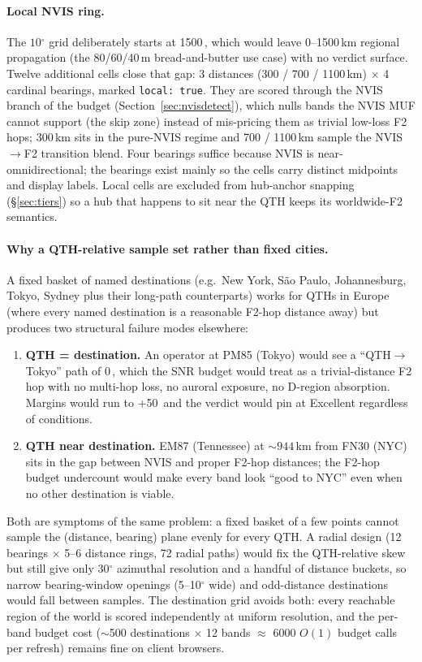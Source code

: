 \documentclass[11pt,a4paper]{article}
\newcommand{\SI}[2]{#1\,\text{#2}}
\newcommand{\dB}{\text{dB}}
\newcommand{\km}{\text{km}}
\newcommand{\degree}{\ensuremath{{}^\circ}}
\begin{document}
\paragraph{Local NVIS ring.}  The $10\degree$ grid deliberately
starts at \SI{1500}{\km}, which would leave 0--1500\,km regional
propagation (the 80/60/40\,m bread-and-butter use case)
with no verdict surface.  Twelve additional cells close that gap:
3 distances (300 / 700 / 1100\,km) $\times$ 4 cardinal bearings,
marked \texttt{local: true}.  They are scored through the NVIS
branch of the budget (Section~\ref{sec:nvisdetect}), which nulls
bands the NVIS MUF cannot support (the skip zone) instead of
mis-pricing them as trivial low-loss F2 hops; 300\,km sits in the
pure-NVIS regime and 700 / 1100\,km sample the NVIS$\to$F2
transition blend.  Four bearings suffice because NVIS is
near-omnidirectional; the bearings exist mainly so the cells carry
distinct midpoints and display labels.  Local cells are excluded
from hub-anchor snapping (\S\ref{sec:tiers}) so a hub that happens
to sit near the QTH keeps its worldwide-F2 semantics.

\paragraph{Why a QTH-relative sample set rather than fixed
cities.}  A fixed basket of named destinations (e.g.\ New York,
S\~ao Paulo,
Johannesburg, Tokyo, Sydney plus their long-path counterparts)
works for QTHs in Europe (where every
named destination is a reasonable F2-hop distance away) but
produces two structural failure modes elsewhere:
\begin{enumerate}[nosep]
  \item \textbf{QTH = destination.}  An operator at PM85 (Tokyo)
        would see a ``QTH$\to$Tokyo'' path of \SI{0}{\km}, which the
        SNR budget would treat as a trivial-distance F2 hop with no
        multi-hop loss, no auroral exposure, no D-region
        absorption.  Margins would run to \SI{+50}{\dB} and the verdict
        would pin at Excellent regardless of conditions.
  \item \textbf{QTH near destination.}  EM87 (Tennessee) at
        ${\sim}\!944$\,km from FN30 (NYC) sits in the gap between
        NVIS and proper F2-hop distances; the F2-hop budget
        undercount would make every band look ``good to NYC'' even
        when no other destination is viable.
\end{enumerate}
Both are symptoms of the same problem: a fixed basket of a few
points
cannot sample the (distance, bearing) plane evenly for every QTH.
A radial design (12 bearings $\times$ 5--6 distance rings,
72 radial paths) would fix the QTH-relative skew but still give only
$30\degree$ azimuthal resolution and a handful of distance
buckets, so narrow bearing-window openings (5--10$\degree$ wide)
and odd-distance destinations would fall between samples.  The
destination grid avoids both: every reachable region of the
world is scored independently at uniform resolution, and the
per-band budget cost (${\sim}$500 destinations $\times$ 12 bands
$\approx$ 6000 $O(1)$ budget calls per refresh) remains fine on
client browsers.
\end{document}
